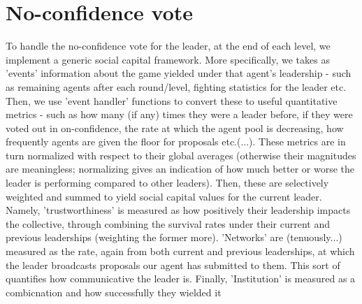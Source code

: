 \section{No-confidence vote}
To handle the no-confidence vote for the leader, at the end of each level, we implement a generic social capital framework. More specifically, we takes as 'events' information about the game yielded under that agent's leadership - such as remaining agents after each round/level, fighting statistics for the leader etc. Then, we use 'event handler' functions to convert these to useful quantitative metrics - such as how many (if any) times they were a leader before, if they were voted out in on-confidence, the rate at which the agent pool is decreasing, how frequently agents are given the floor for proposals etc.(...). These metrics are in turn normalized with respect to their global averages (otherwise their magnitudes are meaningless; normalizing gives an indication of how much better or worse the leader is performing compared to other leaders). Then, these are selectively weighted and summed to yield social capital values for the current leader. Namely, 'trustworthiness' is measured as how positively their leadership impacts the collective, through combining the survival rates under their current and previous leaderships (weighting the former more). 'Networks' are (tenuously...) measured as the rate, again from both current and previous leaderships, at which the leader broadcasts proposals our agent has submitted to them. This sort of quantifies how communicative the leader is. Finally, 'Institution' is measured as a combicnation and how successfully they wielded it

\\

